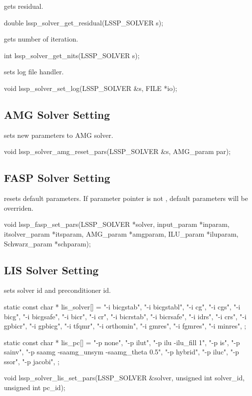  gets residual.
\begin{evb}
double lssp_solver_get_residual(LSSP_SOLVER s);
\end{evb}

 gets number of iteration.
\begin{evb}
int lssp_solver_get_nits(LSSP_SOLVER s);
\end{evb}

 sets log file handler.
\begin{evb}
void lssp_solver_set_log(LSSP_SOLVER &s, FILE *io);
\end{evb}

\subsection{AMG Solver Setting}
 sets new parameters to AMG solver.
\begin{evb}
void lssp_solver_amg_reset_pars(LSSP_SOLVER &s, AMG_param par);
\end{evb}

\subsection{FASP Solver Setting}
 resets default parameters. If parameter pointer is not ,
default parameters will be overriden.
\begin{evb}
void lssp_fasp_set_pars(LSSP_SOLVER *solver, input_param *inparam,
    itsolver_param *itsparam, AMG_param *amgparam, ILU_param *iluparam,
    Schwarz_param *schparam);
\end{evb}

\subsection{LIS Solver Setting}
 sets solver id and preconditioner id.
\begin{evb}
static const char * lis_solver[] = {
    "-i bicgstab",
    "-i bicgstabl",
    "-i cg",
    "-i cgs",
    "-i bicg",
    "-i bicgsafe",
    "-i bicr",
    "-i cr",
    "-i bicrstab",
    "-i bicrsafe",
    "-i idrs",
    "-i crs",
    "-i gpbicr",
    "-i gpbicg",
    "-i tfqmr",
    "-i orthomin",
    "-i gmres",
    "-i fgmres",
    "-i minres",
};

static const char * lis_pc[] = {
    "-p none",
    "-p ilut",
    "-p ilu -ilu_fill 1",
    "-p is",
    "-p sainv",
    "-p saamg -saamg_unsym -saamg_theta 0.5",
    "-p hybrid",
    "-p iluc",
    "-p ssor",
    "-p jacobi",
};

void lssp_solver_lis_set_pars(LSSP_SOLVER &solver, unsigned int solver_id,
    unsigned int pc_id);
\end{evb}

